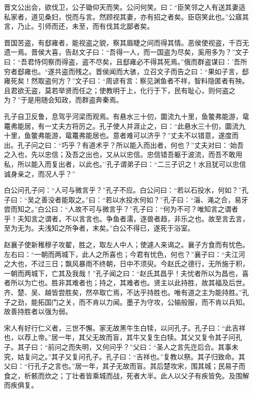 \documentclass[]{article}
\begin{document}
晋文公出会，欲伐卫，公子锄仰天而笑。公问何笑。曰：``臣笑邻之人有送其妻适私家者，道见桑妇，悦而与言。然顾视其妻，亦有招之者矣。臣窃笑此也。''公寤其言，乃止。引师而还，未至，而有伐其北鄙者矣。

晋国苦盗，有郄雍者，能视盗之貌，察其眉睫之间而得其情。恶侯使视盗，千百无遗一焉。晋侯大喜，告赵文子曰：``吾得一人，而一国盗为尽矣，奚用多为？''文子曰：``吾君恃伺察而得盗，盗不尽矣，且郄雍必不得其死焉。''俄而群盗谋曰：'吾所穷者郄雍也。``遂共盗而残之。晋侯闻而大骇，立召文子而告之曰：``果如子言，郄雍死矣！然取盗何方？''文子曰：``周谚有言：察见渊鱼者不祥，智料隐匿者有殃。且君欲无盗，莫若举贤而任之；使教明于上，化行于下，民有耻心，则何盗之为？''于是用随会知政，而群盗奔秦焉。

孔子自卫反鲁，息驾乎河梁而观焉。有悬水三十仞，圜流九十里，鱼鳖弗能游，鼋鼍弗能居，有一丈夫方将厉之。孔子使人并涯止之，曰：``此悬水三十仞，圜流九十里，鱼鳖弗能游，鼋鼍弗能居也。意者难可以济乎？''丈夫不以错意，遂度而出。孔子问之曰：``巧乎？有道术乎？所以能入而出者，何也？''丈夫对曰：`始吾之入也，先以忠信；及吾之出也，又从以忠信。忠信错吾躯于波流，而吾不敢用私，所以能入而复出者，以此也。''孔子谓弟子曰：``二三子识之！水且犹可以忠信诚身亲之，而况人乎？''

白公问孔子问：``人可与微言乎？''孔子不应。白公问曰：``若以石投水，何如？''孔子曰：``吴之善没者能取之。''曰：``若以水投水何如？''孔子曰：``淄、渑之合，易牙尝而知之。''白公曰：``人故不可与微言乎？''孔子曰：``何为不可？唯知言之谓者乎！夫知言之谓者，不以言言也。争鱼者濡，逐兽者趋，非乐之也。故至言去言，至为无为。夫浅知之所争者，末矣。''白公不得已，遂死于浴室。

赵襄子使新稚穆子攻翟，胜之，取左人中人；使遽人来谒之。襄子方食而有忧色。左右曰：``一朝而两城下，此人之所喜也；今君有忧色，何也？''襄子曰：``夫江河之大也，不过三日；飘风暴雨不终朝，日中不须臾。今赵氏之德行，无所施于积，一朝而两城下，亡其及我哉！''孔子闻之曰：``赵氏其昌乎！夫忧者所以为昌也，喜者所以为亡也。胜非其难者也；持之，其难者也。贤主以此持胜，故其福及后世。齐、楚、吴、越皆尝胜矣，然卒取亡焉，不达乎持胜也。唯有道之主为能持胜。''孔子之劲，能拓国门之关，而不肯以力闻。墨子为守攻，公输般服，而不肯以兵知。故善持胜者以强为弱。

宋人有好行仁义者，三世不懈。家无故黑牛生白犊，以问孔子。孔子曰：``此吉祥也，以荐上帝。''居一年，其父无故而盲，其牛又复生白犊。其父又复令其子问孔子。其子曰：``前问之而失明，又何问乎？''父曰：``圣人之言先迕后合。其事未究，姑复问之。''其子又复问孔子。孔子曰：``吉祥也。''复教以祭。其子归致命。其父曰：``行孔子之言也。''居一年，其子无故而盲。其后楚攻宋，围其城；民易子而食之，析骸而炊之；丁壮者皆乘城而战，死者大半。此人以父子有疾皆免。及围解而疾俱复。
\end{document}
